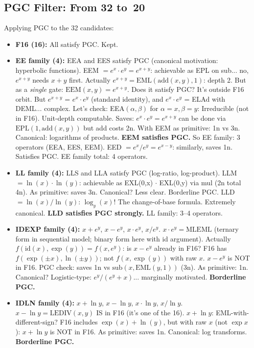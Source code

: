 \documentclass[11pt]{article}
\begin{document}
\subsection{PGC Filter: From 32 to~20}

Applying PGC to the 32 candidates:
\begin{itemize}
  \item \textbf{F16 (16):} All satisfy PGC. Kept.
  \item \textbf{EE family (4):} EEA and EES satisfy PGC (canonical motivation: hyperbolic functions).
        EEM $= e^x \cdot e^y = e^{x+y}$: achievable as EPL on sub... no, $e^{x+y}$ needs $x+y$ first.
        Actually $e^{x+y} = \mathrm{EML}(\mathrm{add}(x,y), 1)$: depth 2. But as a \emph{single} gate:
        $\mathrm{EEM}(x,y) = e^{x+y}$. Does it satisfy PGC? It's outside F16 orbit.
        But $e^{x+y}$ = $e^x \cdot e^y$ (standard identity), and $e^x \cdot e^y$ = ELAd with DEML... complex.
        Let's check: EEA$(\alpha, \beta)$ for $\alpha=x, \beta=y$: Irreducible (not in F16).
        Unit-depth computable. Saves: $e^x \cdot e^y = e^{x+y}$ can be done via $\mathrm{EPL}(1, \mathrm{add}(x,y))$
        but add costs 2n. With EEM as primitive: 1n vs 3n. Canonical: logarithms of products.
        \textbf{EEM satisfies PGC.} So EE family: 3 operators (EEA, EES, EEM).
        EED $= e^x / e^y = e^{x-y}$: similarly, saves 1n. Satisfies PGC.
        EE family total: 4 operators.
  \item \textbf{LL family (4):} LLS and LLA satisfy PGC (log-ratio, log-product).
        LLM $= \ln(x) \cdot \ln(y)$: achievable as EXL(0,x) $\cdot$ EXL(0,y) via mul (2n total 4n).
        As primitive: saves 3n. Canonical? Less clear. Borderline PGC.
        LLD $= \ln(x)/\ln(y)$: $\log_y(x)$! The change-of-base formula. Extremely canonical.
        \textbf{LLD satisfies PGC strongly.} LL family: 3--4 operators.
  \item \textbf{IDEXP family (4):} $x + e^y$, $x - e^y$, $x \cdot e^y$, $x/e^y$.
        $x \cdot e^y = \mathrm{MLEML}$ (ternary form in sequential model; binary form here with id argument).
        Actually $f(\mathrm{id}(x), \exp(y)) = f(x, e^y)$: is $x - e^y$ already in F16?
        F16 has $f(\exp(\pm x), \ln(\pm y))$; not $f(x, \exp(y))$ with raw $x$.
        $x - e^y$ is NOT in F16. PGC check: saves 1n vs $\mathrm{sub}(x, \mathrm{EML}(y,1))$ (3n).
        As primitive: 1n. Canonical? Logistic-type: $e^y / (e^y + x)$... marginally motivated.
        \textbf{Borderline PGC.}
  \item \textbf{IDLN family (4):} $x + \ln y$, $x - \ln y$, $x \cdot \ln y$, $x / \ln y$.
        $x - \ln y = \mathrm{LEDIV}(x,y)$ IS in F16 (it's one of the 16).
        $x + \ln y$: EML-with-different-sign? F16 includes $\exp(x) + \ln(y)$, but with raw $x$ (not $\exp x$):
        $x + \ln y$ is NOT in F16. As primitive: saves 1n. Canonical: log transforms.
        \textbf{Borderline PGC.}
\end{itemize}
\end{document}
